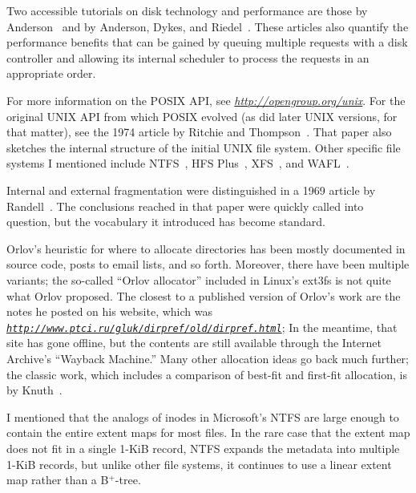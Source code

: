 Two accessible tutorials on disk technology and performance are those
by Anderson~\cite{max1118} and by Anderson, Dykes, and
Riedel~\cite{max1119}.  These articles also quantify the performance
benefits that can be gained by queuing multiple requests with a disk
controller and allowing its internal scheduler to process the requests
in an appropriate order.

For more information on the POSIX API, see
\textit{\url{http://opengroup.org/unix}}.  For the original UNIX API from which POSIX
evolved (as did later UNIX versions, for that matter), see the 1974
article by Ritchie and Thompson~\cite{jhs2.3}.  That paper also
sketches the internal structure of the initial UNIX file system.
Other specific file systems I mentioned include NTFS~\cite{max981},
HFS Plus~\cite{max1133}, XFS~\cite{max1110}, and WAFL~\cite{max1115}.

Internal and external fragmentation were distinguished in a 1969
article by Randell~\cite{max1058}.  The conclusions reached in that
paper were quickly called into question, but the vocabulary it
introduced has become standard.

Orlov's heuristic for where to allocate directories has been mostly
documented in source code, posts to email lists, and so forth.
Moreover, there have been multiple variants; the so-called ``Orlov allocator''
included in Linux's ext3fs is not quite what Orlov proposed.  The
closest to a published version of Orlov's work are the notes he posted on
his website, which was \textit{\href{http://web.archive.org/web/20080131082712/http://www.ptci.ru/gluk/dirpref/old/dirpref.html}{\nolinkurl{http://www.ptci.ru/gluk/dirpref/old/dirpref.html}}};
In the meantime, that site has gone offline, but the contents are still
available through the Internet Archive's ``Wayback Machine.''
Many other allocation
ideas go back much further; the classic work, which includes a
comparison of best-fit and first-fit allocation, is by
Knuth~\cite{max1138}.

I mentioned that the analogs of inodes in Microsoft's NTFS are large
enough to contain the entire extent maps for most files.  In the rare
case that the extent map does not fit in a single 1-KiB record, NTFS
expands the metadata into multiple 1-KiB records, but unlike other file
systems, it continues to use a linear extent map rather than a B$^+$-tree.

